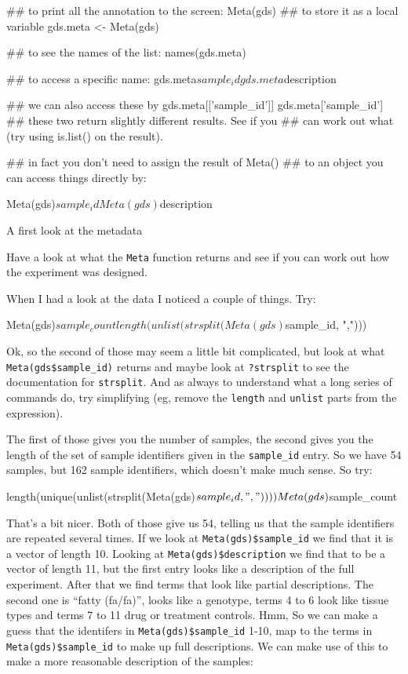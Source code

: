 \documentclass[11pt]{article}
\begin{document}
\begin{listing}
\begin{rcode}
  ## to print all the annotation to the screen:
  Meta(gds)
  ## to store it as a local variable
  gds.meta <- Meta(gds)
  
  ## to see the names of the list:
  names(gds.meta)

  ## to access a specific name:
  gds.meta$sample_id
  gds.meta$description

  ## we can also access these by
  gds.meta[['sample_id']]
  gds.meta['sample_id']
  ## these two return slightly different results. See if you
  ## can work out what (try using is.list() on the result).

  ## in fact you don't need to assign the result of Meta()
  ## to an object you can access things directly by:

  Meta(gds)$sample_id
  Meta(gds)$description
\end{rcode}
\caption{A first look at the metadata}
\label{lis2}
\end{listing}

Have a look at what the \texttt{Meta} function returns and see if you can
work out how the experiment was designed.

When I had a look at the data I noticed a couple of things. Try:

\begin{rcode}
  Meta(gds)$sample_count
  length(unlist( strsplit( Meta(gds)$sample_id, ",")))
\end{rcode}

Ok, so the second of those may seem a little bit complicated, but look at
what \texttt{Meta(gds\$sample\_id)} returns and maybe look at 
\texttt{?strsplit} to see the documentation for \texttt{strsplit}. And
as always to understand what a long series of commands do, try simplifying
(eg, remove the \texttt{length} and \texttt{unlist} parts from the
expression).

The first of those gives you the number of samples, the second gives you
the length of the set of sample identifiers given in the \texttt{sample\_id}
entry. So we have 54 samples, but 162 sample identifiers, which doesn't
make much sense. So try:

\begin{rcode}
length(unique(unlist(strsplit(Meta(gds)$sample_id, ","))))
Meta(gds)$sample_count
\end{rcode}

That's a bit nicer. Both of those give us 54, telling us that the sample
identifiers are repeated several times. If we look at \texttt{Meta(gds)\$sample\_id}
we find that it is a vector of length 10. Looking at \texttt{Meta(gds)\$description}
we find that to be a vector of length 11, but the first entry looks like
a description of the full experiment. After that we find terms that look
like partial descriptions. The second one is ``fatty (fa/fa)'', looks like a
genotype, terms 4 to 6 look like tissue types and terms 7 to 11 drug or
treatment controls. Hmm, So we can make a guess that the identifers in
\texttt{Meta(gds)\$sample\_id} 1-10, map to the terms in \texttt{Meta(gds)\$sample\_id}
to make up full descriptions. We can make use of this to make a more
reasonable description of the samples:
\end{document}
